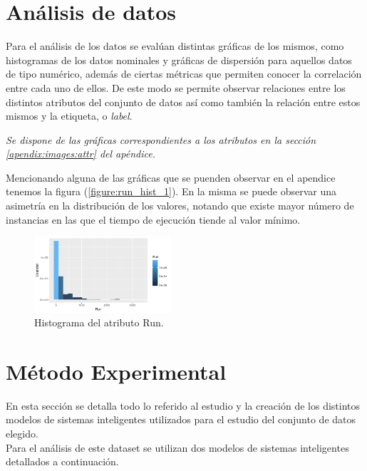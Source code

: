 \documentclass[osajnl,twocolumn,showpacs,superscriptaddress,10pt]{revtex4-1} %
\begin{document}
\section{Análisis de datos}

Para el análisis de los datos se evalúan distintas gráficas de los mismos, como histogramas de los datos nominales y gráficas de dispersión para aquellos datos de tipo numérico, además de ciertas métricas que permiten conocer la correlación entre cada uno de ellos. De este modo se permite observar relaciones entre los distintos atributos del conjunto de datos así como también la relación entre estos mismos y la etiqueta, o \textit{label}.

\begin{flushright}
\textit{\footnotesize Se dispone de las gráficas correspondientes a los atributos en la sección \ref{apendix:images:attr} del apéndice.}
\end{flushright}

Mencionando alguna de las gráficas que se puenden observar en el apendice tenemos la figura (\ref{figure:run_hist_1}). En la misma se puede observar una asimetría en la distribución de los valores, notando que existe mayor número de instancias en las que el tiempo de ejecución tiende al valor mínimo.

\begin{figure}[H]
    \centering
    \includegraphics[width=0.45\textwidth]{plots/run_hist}
    \caption{Histograma del atributo Run.}
    \label{figure:run_hist1}
\end{figure}

\section{Método Experimental}

En esta sección se detalla todo lo referido al estudio y la creación de los distintos modelos de sistemas inteligentes utilizados para el estudio del conjunto de datos elegido. \\

Para el análisis de este dataset se utilizan dos modelos de sistemas inteligentes detallados a continuación. \\
\end{document}
